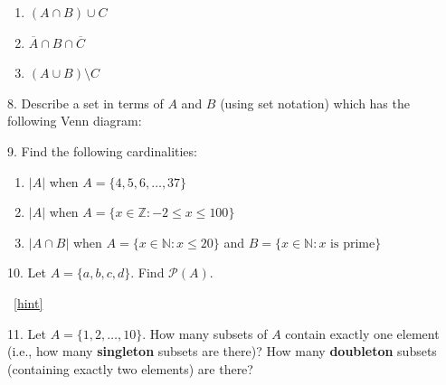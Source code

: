 \documentclass[10pt,]{book}
\newcommand{\terminology}[1]{\textbf{#1}}
\theoremstyle{plain}
\theoremstyle{definition}
\theoremstyle{definition}
\theoremstyle{definition}
\numberwithin{equation}{chapter}
\def\N{\mathbb N}
\def\Z{\mathbb Z}
\def\pow{\mathcal P}
\def\st{:}
\begin{document}
\begin{exerciselist}
\begin{enumerate}[label=(\alph*)]
\item\hypertarget{li-344}{}\((A \cap B) \cup C\)%
\item\hypertarget{li-345}{}\(\overline A \cap B \cap \overline C\)%
\item\hypertarget{li-346}{}\((A \cup B) \setminus C\)%
\end{enumerate}
%
\par\smallskip
\item[8.]\hypertarget{exercise-73}{}\hypertarget{p-2141}{}%
Describe a set in terms of \(A\) and \(B\) (using set notation) which has the following Venn diagram:%
\begin{sidebyside}{1}{0.4}{0.4}{0}
\begin{sbspanel}{0.2}
\end{sbspanel}
\end{sidebyside}
\par\smallskip
\item[9.]\hypertarget{exercise-74}{}\hypertarget{p-2142}{}%
Find the following cardinalities: \leavevmode%
\begin{enumerate}[label=(\alph*)]
\item\hypertarget{li-353}{}\(|A|\) when \(A = \{4,5,6,\ldots,37\}\)%
\item\hypertarget{li-354}{}\(|A|\) when \(A = \{x \in \Z \st -2 \le x \le 100\}\)%
\item\hypertarget{li-355}{}\(|A \cap B|\) when \(A = \{x \in \N \st x \le 20\}\) and \(B = \{x \in \N \st x \mbox{ is prime} \}\)%
\end{enumerate}
%
\par\smallskip
\item[10.]\hypertarget{exercise-75}{}\hypertarget{p-2147}{}%
Let \(A = \{a, b, c, d\}\). Find \(\pow(A)\).%
\par\smallskip
~\hfill{\tiny\hyperlink{a-B.2.10}{[hint]}\hypertarget{q-B.2.10}{}}\item[11.]\hypertarget{exercise-76}{}\hypertarget{p-2149}{}%
Let \(A = \{1,2,\ldots, 10\}\). How many subsets of \(A\) contain exactly one element (i.e., how many \terminology{singleton} subsets are there)? How many \terminology{doubleton} subsets (containing exactly two elements) are there?%

\end{exerciselist}
\end{document}
